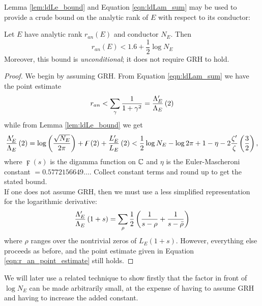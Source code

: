 Lemma \ref{lem:ldLe_bound} and Equation \ref{eqn:ldLam_sum} may be used to provide a crude bound on the analytic rank of $E$ with respect to its conductor:
\begin{corollary}\label{cor:logderiv_rank_bound}
Let $E$ have analytic rank $r_{an}(E)$ and conductor $N_E$. Then
\begin{equation}
r_{an}(E) < 1.6 + \frac{1}{2} \log N_E
\end{equation}
Moreover, this bound is {\it unconditional}; it does not require GRH to hold.
\end{corollary}
\begin{proof}
We begin by assuming GRH. From Equation \ref{eqn:ldLam_sum} we have the point estimate
\begin{equation}\label{eqn:r_an_point_estimate}
r_{an} < \sum_{\gamma} \frac{1}{1+\gamma^2} = \frac{\Lambda_E^{\prime}}{\Lambda_E}\left(2\right)
\end{equation}
while from Lemma \ref{lem:ldLe_bound} we get
\begin{equation}
\frac{\Lambda_E^{\prime}}{\Lambda_E}\left(2\right) =  \log\left(\frac{\sqrt{N_E}}{2\pi}\right) + \digamma(2) + \frac{L_E^{\prime}}{L_E}\left(2\right) < \frac{1}{2}\log N_E  - \log 2\pi + 1-\eta -2\frac{\zeta^{\prime}}{\zeta}\left(\frac{3}{2}\right),
\end{equation}
where $\digamma(s)$ is the digamma function on $\mathbb{C}$ and $\eta$ is the Euler-Mascheroni constant $= 0.5772156649\ldots$. Collect constant terms and round up to get the stated bound. \\

If one does not assume GRH, then we must use a less simplified representation for the logarithmic derivative:
\begin{equation}
\frac{\Lambda_E^{\prime}}{\Lambda_E}\left(1+s\right) = \sum_{\rho} \frac{1}{2}\left( \frac{1}{s-\rho} + \frac{1}{s-\bar{\rho}}\right)
\end{equation}
where $\rho$ ranges over the nontrivial zeros of $L_E(1+s)$. However, everything else proceeds as before, and the point estimate given in Equation \ref{eqn:r_an_point_estimate} still holds.
\end{proof}
We will later use a related technique to show firstly that the factor in front of $\log N_E$ can be made arbitrarily small, at the expense of having to assume GRH and having to increase the added constant. \\

